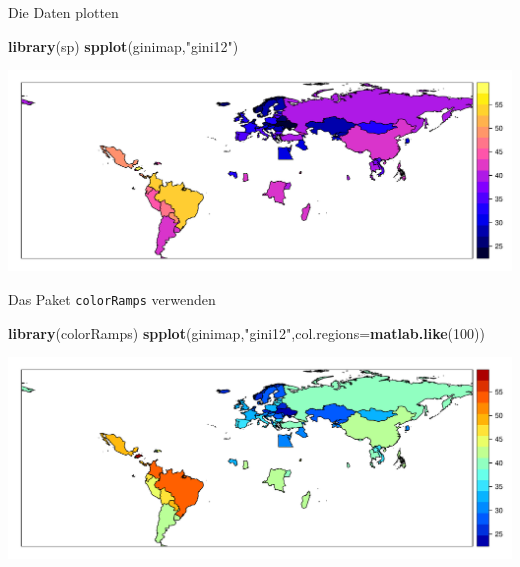 \documentclass[ignorenonframetext,]{beamer}
\newenvironment{Shaded}{\begin{snugshade}}{\end{snugshade}}
\newcommand{\DataTypeTok}[1]{\textcolor[rgb]{0.13,0.29,0.53}{#1}}
\newcommand{\DecValTok}[1]{\textcolor[rgb]{0.00,0.00,0.81}{#1}}
\newcommand{\KeywordTok}[1]{\textcolor[rgb]{0.13,0.29,0.53}{\textbf{#1}}}
\newcommand{\NormalTok}[1]{#1}
\newcommand{\StringTok}[1]{\textcolor[rgb]{0.31,0.60,0.02}{#1}}
\begin{document}
\begin{frame}[fragile]{Die Daten plotten}
\protect\hypertarget{die-daten-plotten}{}

\begin{Shaded}
\begin{Highlighting}[]
\KeywordTok{library}\NormalTok{(sp)}
\KeywordTok{spplot}\NormalTok{(ginimap,}\StringTok{"gini12"}\NormalTok{)}
\end{Highlighting}
\end{Shaded}

\includegraphics{A5_Choroplethen_files/figure-beamer/unnamed-chunk-13-1.pdf}

\end{frame}

\begin{frame}[fragile]{Das Paket \texttt{colorRamps} verwenden}
\protect\hypertarget{das-paket-colorramps-verwenden}{}

\begin{Shaded}
\begin{Highlighting}[]
\KeywordTok{library}\NormalTok{(colorRamps)}
\KeywordTok{spplot}\NormalTok{(ginimap,}\StringTok{"gini12"}\NormalTok{,}\DataTypeTok{col.regions=}\KeywordTok{matlab.like}\NormalTok{(}\DecValTok{100}\NormalTok{))}
\end{Highlighting}
\end{Shaded}

\includegraphics{A5_Choroplethen_files/figure-beamer/unnamed-chunk-14-1.pdf}

\end{frame}
\end{document}
